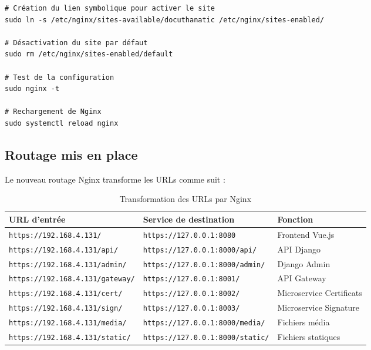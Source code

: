 \documentclass[12pt,a4paper]{article}
\begin{document}
\begin{lstlisting}[style=bash, caption={Activation du site Nginx}]
# Création du lien symbolique pour activer le site
sudo ln -s /etc/nginx/sites-available/docuthanatic /etc/nginx/sites-enabled/

# Désactivation du site par défaut
sudo rm /etc/nginx/sites-enabled/default

# Test de la configuration
sudo nginx -t

# Rechargement de Nginx
sudo systemctl reload nginx
\end{lstlisting}

\subsection{Routage mis en place}

Le nouveau routage Nginx transforme les URLs comme suit :

\begin{table}[H]
\centering
\caption{Transformation des URLs par Nginx}
\label{tab:routage_nginx}
\begin{tabularx}{\textwidth}{|X|X|X|}
\hline
\textbf{URL d'entrée} & \textbf{Service de destination} & \textbf{Fonction} \\
\hline
\texttt{https://192.168.4.131/} & \texttt{https://127.0.0.1:8080} & Frontend Vue.js \\
\hline
\texttt{https://192.168.4.131/api/} & \texttt{https://127.0.0.1:8000/api/} & API Django \\
\hline
\texttt{https://192.168.4.131/admin/} & \texttt{https://127.0.0.1:8000/admin/} & Django Admin \\
\hline
\texttt{https://192.168.4.131/gateway/} & \texttt{https://127.0.0.1:8001/} & API Gateway \\
\hline
\texttt{https://192.168.4.131/cert/} & \texttt{https://127.0.0.1:8002/} & Microservice Certificats \\
\hline
\texttt{https://192.168.4.131/sign/} & \texttt{https://127.0.0.1:8003/} & Microservice Signature \\
\hline
\texttt{https://192.168.4.131/media/} & \texttt{https://127.0.0.1:8000/media/} & Fichiers média \\
\hline
\texttt{https://192.168.4.131/static/} & \texttt{https://127.0.0.1:8000/static/} & Fichiers statiques \\
\hline
\end{tabularx}
\end{table}
\end{document}

